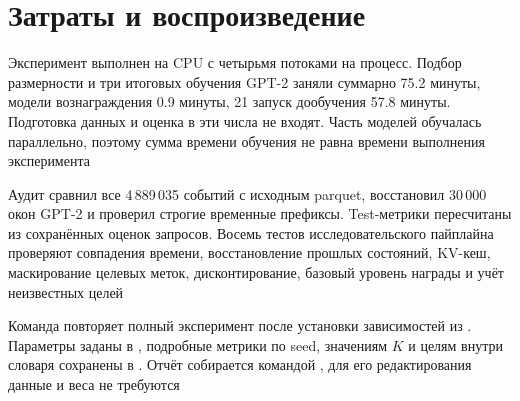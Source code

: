 \FloatBarrier
{}
\section{Затраты и воспроизведение}

Эксперимент выполнен на CPU с четырьмя потоками на процесс.
Подбор размерности и три итоговых обучения GPT-2 заняли суммарно
75.2 минуты, модели вознаграждения 0.9 минуты,
21 запуск дообучения 57.8 минуты.
Подготовка данных и оценка в эти числа не входят.
Часть моделей обучалась параллельно,
поэтому сумма времени обучения не равна времени выполнения эксперимента

Аудит сравнил все 4\,889\,035 событий с исходным parquet,
восстановил 30\,000 окон GPT-2 и проверил строгие временные префиксы.
Test-метрики пересчитаны из сохранённых оценок запросов.
Восемь тестов исследовательского пайплайна проверяют совпадения времени,
восстановление прошлых состояний, KV-кеш, маскирование целевых меток,
дисконтирование, базовый уровень награды и учёт неизвестных целей

Команда \mbox{} повторяет полный эксперимент
после установки зависимостей из \mbox{}.
Параметры заданы в , подробные метрики
по seed, значениям \(K\) и целям внутри словаря сохранены
в .
Отчёт собирается командой \mbox{},
для его редактирования данные и веса не требуются
